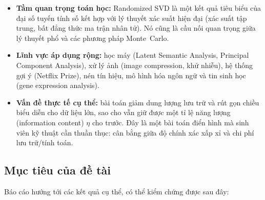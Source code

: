 \begin{itemize}
    \item \textbf{Tầm quan trọng toán học:} Randomized SVD là một kết quả tiêu
    biểu của đại số tuyến tính số kết hợp với lý thuyết xác suất hiện đại
    (xác suất tập trung, bất đẳng thức ma trận nhân tử). Nó cũng là cầu nối
    quan trọng giữa lý thuyết phổ và các phương pháp Monte~Carlo.
    \item \textbf{Lĩnh vực áp dụng rộng:} học máy (Latent Semantic Analysis,
    Principal Component Analysis), xử lý ảnh (image compression, khử nhiễu),
    hệ thống gợi ý (Netflix Prize), nén tín hiệu, mô hình hóa ngôn ngữ và tin
    sinh học (gene expression analysis).
    \item \textbf{Vấn đề thực tế cụ thể:} bài toán giảm dung lượng lưu trữ và
    rút gọn chiều biểu diễn cho dữ liệu lớn, sao cho vẫn giữ được một tỉ lệ
    năng lượng (information content) $\eta$ cho trước. Đây là một bài toán
    điển hình mà sinh viên kỹ thuật cần thuần thục: cân bằng giữa độ chính
    xác xấp xỉ và chi phí lưu trữ/tính toán.
\end{itemize}

\subsection{Mục tiêu của đề tài}\label{subsec:goals}

Báo cáo hướng tới các kết quả cụ thể, có thể kiểm chứng được sau đây:

